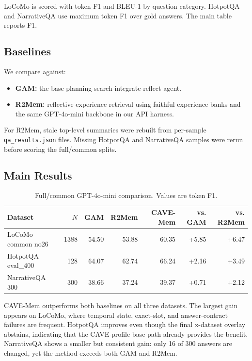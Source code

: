 \documentclass[11pt]{article}
\newcommand{\method}{CAVE-Mem}
\begin{document}
LoCoMo is scored with token F1 and BLEU-1 by question category. HotpotQA and
NarrativeQA use maximum token F1 over gold answers. The main table reports F1.

\subsection{Baselines}

We compare against:

\begin{itemize}[leftmargin=*]
  \item \textbf{GAM:} the base planning-search-integrate-reflect agent.
  \item \textbf{R2Mem:} reflective experience retrieval using faithful
  experience banks and the same GPT-4o-mini backbone in our API harness.
\end{itemize}

For R2Mem, stale top-level summaries were rebuilt from per-sample
\texttt{qa\_results.json} files. Missing HotpotQA and NarrativeQA samples were
rerun before scoring the full/common splits.

\subsection{Main Results}

\begin{table}[t]
\centering
\small
\begin{tabular}{lrrrrrr}
\toprule
Dataset & $N$ & GAM & R2Mem & \method{} & vs. GAM & vs. R2Mem \\
\midrule
LoCoMo common no26 & 1388 & 54.50 & 53.88 & 60.35 & +5.85 & +6.47 \\
HotpotQA eval\_400 & 128 & 64.07 & 62.74 & 66.24 & +2.16 & +3.49 \\
NarrativeQA 300 & 300 & 38.66 & 37.24 & 39.37 & +0.71 & +2.12 \\
\bottomrule
\end{tabular}
\caption{Full/common GPT-4o-mini comparison. Values are token F1.}
\label{tab:main}
\end{table}

\method{} outperforms both baselines on all three datasets. The largest gain
appears on LoCoMo, where temporal state, exact-slot, and answer-contract
failures are frequent. HotpotQA improves even though the final x-dataset
overlay abstains, indicating that the CAVE-profile base path already provides
the benefit. NarrativeQA shows a smaller but consistent gain: only 16 of 300
answers are changed, yet the method exceeds both GAM and R2Mem.
\end{document}
